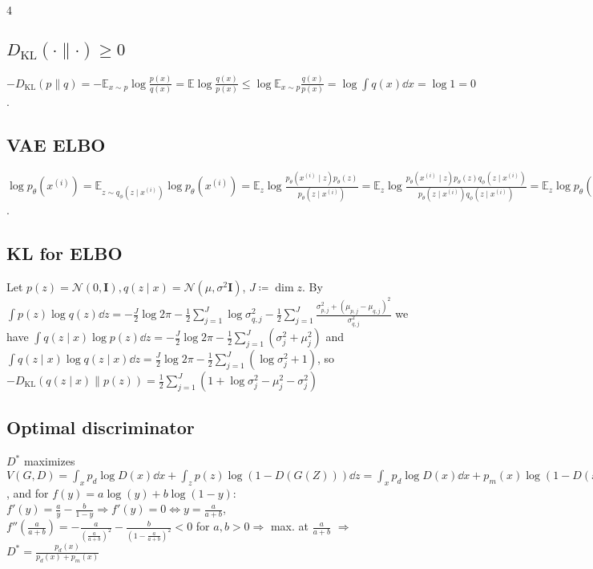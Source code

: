 \documentclass[11pt,landscape,a4paper,fleqn]{article}
\newcommand{\kl}[2]{D_{\mathrm{KL}}(#1\lVert#2)}
\newcommand{\E}{\mathbb{E}}
\def\mymatrix#1{\mathbf{#1}}
\def\mI{{\mymatrix{I}}}
\begin{document}
\begin{multicols*}{4}
\subsection*{$\kl{\cdot}{\cdot} \geq 0$}

$-\kl{p}{q} = -\E_{x \sim p} \log \frac{p(x)}{q(x)} = \E \log \frac{q(x)}{p(x)} \leq \log \E_{x \sim p} \frac{q(x)}{p(x)}
= \log \int q(x) \dd x = \log 1 = 0$.

\subsection*{VAE ELBO}

\def\ith{^{(i)}}
$\log p_\theta(x\ith)
= \E_{z \sim q_\phi(z \mid x\ith)} \log p_\theta(x\ith)
= \E_z \log \frac{p_\theta(x\ith \mid z) p_\theta(z)}{p_\theta(z \mid x\ith)}
= \E_z \log \frac{p_\theta(x\ith \mid z) p_\theta(z) q_\phi(z \mid x\ith)}{p_\theta(z \mid x\ith) q_\phi(z \mid x\ith)}
= \E_z \log p_\theta(x\ith \mid z) - \E_z \log \frac{q_\phi(z \mid x\ith)}{p_\theta(z)} + \E_z \log \frac{q_\phi(z \mid x\ith)}{p_\theta(z \mid x\ith)}
= \E_z \log p_\theta(x\ith \mid z) - \kl{q_\phi(z \mid x\ith)}{p_\theta(z)} + \kl{q_\phi(z \mid x\ith)}{p_\theta(z \mid x\ith)}$.

\subsection*{KL for ELBO} Let $p(z) = \mathcal{N}(0, \mI), q(z\mid x) = \mathcal{N}(\mu, \sigma^2 \mI)$, $J \coloneqq \dim z$.
By $\int p(z) \log q(z) \dd z = - \frac{J}{2} \log 2\pi - \frac{1}{2} \sum_{j = 1}^J \log\sigma^2_{q, j}
- \frac{1}{2} \sum_{j = 1}^J \frac{\sigma_{p, j}^2 + (\mu_{p, j} - \mu_{q, j})^2}{\sigma^2_{q, j}}$
we have $\int q(z\mid x) \log p(z) \dd z = - \frac{J}{2} \log 2\pi - \frac{1}{2} \sum_{j = 1}^J(\sigma_j^2 + \mu_j^2)$
and $\int q(z\mid x) \log q(z\mid x) \dd z = \frac{J}{2} \log 2\pi - \frac{1}{2} \sum_{j = 1}^J(\log \sigma_j^2 + 1)$,
so $ - \kl{q(z\mid x)}{p(z)} = \frac{1}{2} \sum_{j = 1}^J (1 + \log \sigma_j^2 - \mu_j^2 - \sigma_j^2)$

\subsection*{Optimal discriminator} $D^*$ maximizes $V(G, D) = \int_x p_d \log D(x) \dd x + \int_z p(z) \log(1 - D(G(Z))) \dd z
= \int_x p_d \log D(x) \dd x + p_m(x) \log(1 - D(x)) \dd z$,
and for $f(y) = a\log(y) + b\log(1 - y):$
$f'(y) = \frac{a}{y} - \frac{b}{1 - y} \Rightarrow f'(y) = 0 \Leftrightarrow y = \frac{a}{a + b}$,
$f''(\frac{a}{a + b}) = - \frac{a}{\left(\frac{a}{a + b}\right)^2} - \frac{b}{\left(1 - \frac{a}{a + b}\right)^2} < 0$
for $a, b > 0 \Rightarrow $ max. at $\frac{a}{a + b}$ $\Rightarrow$ $D^* = \frac{p_d(x)}{p_d(x) + p_m(x)}$


\end{multicols*}
\end{document}
